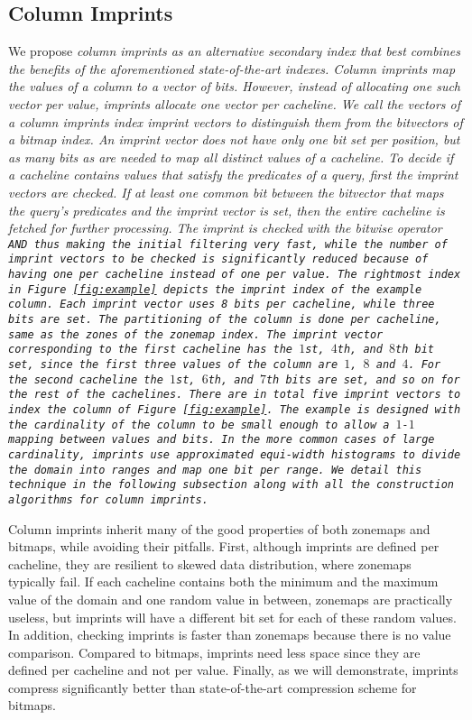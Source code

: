 \subsection{Column Imprints}

We propose \it{column imprints} as an alternative secondary index that best
combines the benefits of the aforementioned state-of-the-art indexes.
Column imprints map the values of a column to a vector of bits. However,
instead of allocating one such vector per value, imprints allocate one
vector per cacheline. We call the vectors of a column imprints index
\it{imprint vectors} to distinguish them from the bitvectors of a bitmap
index. An imprint vector does not have only one bit set per position, but as
many bits as are needed to map all distinct values of a cacheline. To decide if
a cacheline contains values that satisfy the predicates of a query, first
the imprint vectors are checked. If at least one common bit between the
bitvector that maps the query's predicates and the imprint vector is set, then
the entire cacheline is fetched for further processing. The imprint is checked
with the bitwise operator \tt{AND} thus making the initial filtering very fast,
while the number of imprint vectors to be checked is significantly reduced
because of having one per cacheline instead of one per value. The rightmost
index in Figure~\ref{fig:example} depicts the imprint index of the example
column. Each imprint vector uses 8 bits per cacheline, while three
bits are set. The partitioning of the column is done per
cacheline, same as the zones of the zonemap index. The imprint vector
corresponding to the first cacheline has the $1$st, $4$th, and $8$th bit
set, since the first three values of the column are $1$, $8$ and $4$. For the
second cacheline the $1$st, $6$th, and $7$th bits are set, and so on
for the rest of the cachelines. There are in total five imprint
vectors to index the column of Figure~\ref{fig:example}. The example is
designed with the cardinality of the column to be small enough to allow a
$1$-$1$ mapping between values and bits. In the more common cases of large
cardinality, imprints use approximated equi-width histograms to divide the
domain into ranges and map one bit per range. We detail this technique in
the following subsection along with all the construction algorithms for column
imprints.

Column imprints inherit many of the good properties of both zonemaps and
bitmaps, while avoiding their pitfalls. First, although imprints are defined
per cacheline, they are resilient to skewed data distribution, where zonemaps
typically fail. If each cacheline contains both the minimum and the maximum
value of the domain and one random value in between, zonemaps are practically
useless, but imprints will have a different bit set for each of these random
values. In addition, checking imprints is faster than zonemaps because there is
no value comparison. Compared to bitmaps, imprints need less space since they
are defined per cacheline and not per value. Finally, as we will demonstrate,
imprints compress significantly better than state-of-the-art compression
scheme for bitmaps.

